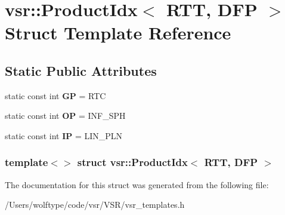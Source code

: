 \hypertarget{structvsr_1_1_product_idx_3_01_r_t_t_00_01_d_f_p_01_4}{\section{vsr\-:\-:Product\-Idx$<$ R\-T\-T, D\-F\-P $>$ Struct Template Reference}
\label{structvsr_1_1_product_idx_3_01_r_t_t_00_01_d_f_p_01_4}
}
\subsection*{Static Public Attributes}
\begin{DoxyCompactItemize}
\item 
\hypertarget{structvsr_1_1_product_idx_3_01_r_t_t_00_01_d_f_p_01_4_a2094fe5146675e4aea4cee2a6286ac3a}{static const int {\bfseries G\-P} = R\-T\-C}\label{structvsr_1_1_product_idx_3_01_r_t_t_00_01_d_f_p_01_4_a2094fe5146675e4aea4cee2a6286ac3a}

\item 
\hypertarget{structvsr_1_1_product_idx_3_01_r_t_t_00_01_d_f_p_01_4_a9562adeadbb86b43e5ac0d9b7c61cff2}{static const int {\bfseries O\-P} = I\-N\-F\-\_\-\-S\-P\-H}\label{structvsr_1_1_product_idx_3_01_r_t_t_00_01_d_f_p_01_4_a9562adeadbb86b43e5ac0d9b7c61cff2}

\item 
\hypertarget{structvsr_1_1_product_idx_3_01_r_t_t_00_01_d_f_p_01_4_a197c0fc00dee29a306690ee1df33fdcd}{static const int {\bfseries I\-P} = L\-I\-N\-\_\-\-P\-L\-N}\label{structvsr_1_1_product_idx_3_01_r_t_t_00_01_d_f_p_01_4_a197c0fc00dee29a306690ee1df33fdcd}

\end{DoxyCompactItemize}
\subsubsection*{template$<$$>$ struct vsr\-::\-Product\-Idx$<$ R\-T\-T, D\-F\-P $>$}



The documentation for this struct was generated from the following file\-:\begin{DoxyCompactItemize}
\item 
/\-Users/wolftype/code/vsr/\-V\-S\-R/vsr\-\_\-templates.\-h\end{DoxyCompactItemize}
